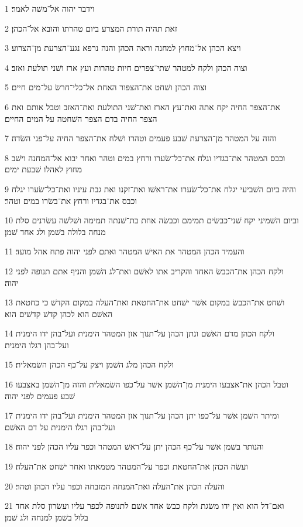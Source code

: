 \par 1 וידבר יהוה אל־משׁה לאמר׃
\par 2 זאת תהיה תורת המצרע ביום טהרתו והובא אל־הכהן׃
\par 3 ויצא הכהן אל־מחוץ למחנה וראה הכהן והנה נרפא נגע־הצרעת מן־הצרוע׃
\par 4 וצוה הכהן ולקח למטהר שׁתי־צפרים חיות טהרות ועץ ארז ושׁני תולעת ואזב׃
\par 5 וצוה הכהן ושׁחט את־הצפור האחת אל־כלי־חרשׂ על־מים חיים׃
\par 6 את־הצפר החיה יקח אתה ואת־עץ הארז ואת־שׁני התולעת ואת־האזב וטבל אותם ואת הצפר החיה בדם הצפר השׁחטה על המים החיים׃
\par 7 והזה על המטהר מן־הצרעת שׁבע פעמים וטהרו ושׁלח את־הצפר החיה על־פני השׂדה׃
\par 8 וכבס המטהר את־בגדיו וגלח את־כל־שׂערו ורחץ במים וטהר ואחר יבוא אל־המחנה וישׁב מחוץ לאהלו שׁבעת ימים׃
\par 9 והיה ביום השׁביעי יגלח את־כל־שׂערו את־ראשׁו ואת־זקנו ואת גבת עיניו ואת־כל־שׂערו יגלח וכבס את־בגדיו ורחץ את־בשׂרו במים וטהר׃
\par 10 וביום השׁמיני יקח שׁני־כבשׂים תמימם וכבשׂה אחת בת־שׁנתה תמימה ושׁלשׁה עשׂרנים סלת מנחה בלולה בשׁמן ולג אחד שׁמן׃
\par 11 והעמיד הכהן המטהר את האישׁ המטהר ואתם לפני יהוה פתח אהל מועד׃
\par 12 ולקח הכהן את־הכבשׂ האחד והקריב אתו לאשׁם ואת־לג השׁמן והניף אתם תנופה לפני יהוה׃
\par 13 ושׁחט את־הכבשׂ במקום אשׁר ישׁחט את־החטאת ואת־העלה במקום הקדשׁ כי כחטאת האשׁם הוא לכהן קדשׁ קדשׁים הוא׃
\par 14 ולקח הכהן מדם האשׁם ונתן הכהן על־תנוך אזן המטהר הימנית ועל־בהן ידו הימנית ועל־בהן רגלו הימנית׃
\par 15 ולקח הכהן מלג השׁמן ויצק על־כף הכהן השׂמאלית׃
\par 16 וטבל הכהן את־אצבעו הימנית מן־השׁמן אשׁר על־כפו השׂמאלית והזה מן־השׁמן באצבעו שׁבע פעמים לפני יהוה׃
\par 17 ומיתר השׁמן אשׁר על־כפו יתן הכהן על־תנוך אזן המטהר הימנית ועל־בהן ידו הימנית ועל־בהן רגלו הימנית על דם האשׁם׃
\par 18 והנותר בשׁמן אשׁר על־כף הכהן יתן על־ראשׁ המטהר וכפר עליו הכהן לפני יהוה׃
\par 19 ועשׂה הכהן את־החטאת וכפר על־המטהר מטמאתו ואחר ישׁחט את־העלה׃
\par 20 והעלה הכהן את־העלה ואת־המנחה המזבחה וכפר עליו הכהן וטהר׃
\par 21 ואם־דל הוא ואין ידו משׂגת ולקח כבשׂ אחד אשׁם לתנופה לכפר עליו ועשׂרון סלת אחד בלול בשׁמן למנחה ולג שׁמן׃
